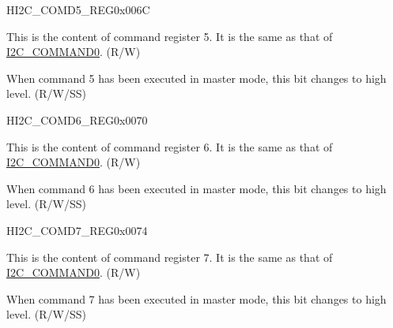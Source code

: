 \begin{register}{H}{I2C\_COMD5\_REG}{0x006C}\label{regdesc:I2CCOMD5REG}
%
%
%
\regnewline%
\begin{regdesc}\begin{reglist}
\label{fielddesc:I2CCOMMAND5}\item [I2C\_COMMAND5] This is the content of command register 5. It is the same as that of \hyperref[fielddesc:I2CCOMMAND0]{I2C\_COMMAND0}. (R/W)
\label{fielddesc:I2CCOMMAND5DONE}\item [I2C\_COMMAND5\_DONE] When command 5 has been executed in master mode, this bit changes to high level. (R/W/SS)
\end{reglist}\end{regdesc}
\end{register}


\begin{register}{H}{I2C\_COMD6\_REG}{0x0070}\label{regdesc:I2CCOMD6REG}
%
%
%
\regnewline%
\begin{regdesc}\begin{reglist}
\label{fielddesc:I2CCOMMAND6}\item [I2C\_COMMAND6] This is the content of command register 6. It is the same as that of \hyperref[fielddesc:I2CCOMMAND0]{I2C\_COMMAND0}. (R/W)
\label{fielddesc:I2CCOMMAND6DONE}\item [I2C\_COMMAND6\_DONE] When command 6 has been executed in master mode, this bit changes to high level. (R/W/SS)
\end{reglist}\end{regdesc}
\end{register}


\begin{register}{H}{I2C\_COMD7\_REG}{0x0074}\label{regdesc:I2CCOMD7REG}
%
%
%
\regnewline%
\begin{regdesc}\begin{reglist}
\label{fielddesc:I2CCOMMAND7}\item [I2C\_COMMAND7] This is the content of command register 7. It is the same as that of \hyperref[fielddesc:I2CCOMMAND0]{I2C\_COMMAND0}. (R/W)
\label{fielddesc:I2CCOMMAND7DONE}\item [I2C\_COMMAND7\_DONE] When command 7 has been executed in master mode, this bit changes to high level. (R/W/SS)
\end{reglist}\end{regdesc}
\end{register}


